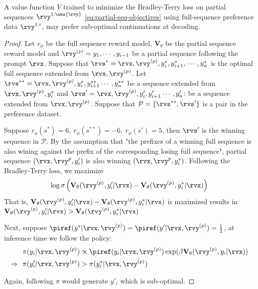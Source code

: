 

\begin{theorem} \label{thm:PARGS}
  \label{thm:full_for_partial}
  A value function $V$ trained to minimize the Bradley-Terry loss on partial sequences $\rvy^{1:\abs{\rvy}}$ \eqref{eq:partial-seq-objectives}  using full-sequence preference data $\rvy^{1:i}$, may prefer sub-optimal continuations at decoding.
\end{theorem}

\begin{proof}
    Let $r_\phi$ be the full sequence reward model, $\mathbf{V}_{\theta}$ be the partial sequence reward model and $\rvy^{(p)} = y_1, \cdots, y_{i-1}$ be a partial sequence following the prompt $\rvx$. Suppose that $\rvs^* = \rvx, \rvy^{(p)}, y^*_{i}, y^*_{i+1}, \cdots, y^*_{n}$ is the optimal full sequence extended from ${\rvx, \rvy^{(p)}}$. Let $\rvs^{**} = \rvx, \rvy^{(p)}, y^*_{i}, y^{**}_{i+1} \cdots, y^{**}_{n}$ be a sequence extended from ${\rvx, \rvy^{(p)}, y^*_{i}}$ and $\rvs' = \rvx, \rvy^{(p)}, y'_{i}, y'_{i+1} \cdots, y'_{n}$: be a sequence extended from ${\rvx, \rvy^{(p)}}$. Suppose that $\mathcal{P} = \{\rvs^{**}, \rvs'\}$ is a pair in the preference dataset. 

    Suppose $r_{\phi}(s^*)=6, \:r_{\phi}(s^{**})=-6, \:r_{\phi}(s')=5$, then $\rvs'$ is the winning sequence in $\mathcal{P}$. By the assumption that "the prefixes of a winning full sequence is also wining against the prefix of the corresponding losing full sequence", partial sequence $(\rvx, \rvy^{p}, y'_{i})$ is also winning $(\rvx, \rvy^{p}, y^*_{i})$.  Following the Bradley-Terry loss, we maximize
$$
\begin{aligned}
     \log \sigma \left( \mathbf{V}_{\theta} (\rvy^{(p)}, y'_{i}|\rvx) - \mathbf{V}_{\theta} (\rvy^{(p)}, y^*_{i}|\rvx)\right)
\end{aligned}
$$
That is, $\mathbf{V}_{\theta} (\rvy^{(p)}, y'_{i}|\rvx) - \mathbf{V}_{\theta} (\rvy^{(p)}, y^*_{i}|\rvx)$ is maximized results in $\mathbf{V}_{\theta} (\rvy^{(p)}, y'_{i}|\rvx) > \mathbf{V}_{\theta} (\rvy^{(p)}, y^*_{i}|\rvx)$

Next, suppose $\piref(y^{*}|\rvx, \rvy^{(p)}) = \piref(y'|\rvx, \rvy^{(p)}) = \frac{1}{2}$, at inference time we follow the policy:
$$ 
\begin{aligned}
&\pi(y_{i} \vert \rvx,\rvy^{(p)}) \propto \piref(y_{i} \vert \rvx,\rvy^{(p)}) \exp(\beta \mathbf{V}_{\theta}(\rvy^{(p)}, y_{i} \vert \rvx))\\
\Rightarrow ~~ &\pi(y'_{i} \vert \rvx,\rvy^{(p)}) > \pi(y^{*}_{i} \vert \rvx,\rvy^{(p)})
\end{aligned}
$$

Again, following $\pi$ would generate $y'_{i}$ which is sub-optimal.
\end{proof}
    
